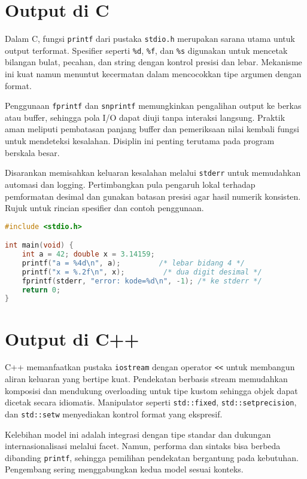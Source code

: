 \documentclass[../main.tex]{subfiles}
\begin{document}
\section{Output di C}
Dalam C, fungsi \texttt{printf} dari pustaka \texttt{stdio.h} merupakan sarana utama untuk output terformat. Spesifier seperti \texttt{\%d}, \texttt{\%f}, dan \texttt{\%s} digunakan untuk mencetak bilangan bulat, pecahan, dan string dengan kontrol presisi dan lebar. Mekanisme ini kuat namun menuntut kecermatan dalam mencocokkan tipe argumen dengan format.

Penggunaan \texttt{fprintf} dan \texttt{snprintf} memungkinkan pengalihan output ke berkas atau buffer, sehingga pola I/O dapat diuji tanpa interaksi langsung. Praktik aman meliputi pembatasan panjang buffer dan pemeriksaan nilai kembali fungsi untuk mendeteksi kesalahan. Disiplin ini penting terutama pada program berskala besar.

Disarankan memisahkan keluaran kesalahan melalui \texttt{stderr} untuk memudahkan automasi dan logging. Pertimbangkan pula pengaruh lokal terhadap pemformatan desimal dan gunakan batasan presisi agar hasil numerik konsisten. Rujuk \textcite{k&r-c-output-input,gnu-c-manual,iso-c-draft-n1570} untuk rincian spesifier dan contoh penggunaan.

\begin{lstlisting}[language=C, caption={Contoh output C dengan printf}, label={lst:c-output}]
#include <stdio.h>

int main(void) {
    int a = 42; double x = 3.14159;
    printf("a = %4d\n", a);         /* lebar bidang 4 */
    printf("x = %.2f\n", x);         /* dua digit desimal */
    fprintf(stderr, "error: kode=%d\n", -1); /* ke stderr */
    return 0;
}
\end{lstlisting}

\section{Output di C++}
C++ memanfaatkan pustaka \texttt{iostream} dengan operator \texttt{<<} untuk membangun aliran keluaran yang bertipe kuat. Pendekatan berbasis stream memudahkan komposisi dan mendukung overloading untuk tipe kustom sehingga objek dapat dicetak secara idiomatis. Manipulator seperti \texttt{std::fixed}, \texttt{std::setprecision}, dan \texttt{std::setw} menyediakan kontrol format yang ekspresif.

Kelebihan model ini adalah integrasi dengan tipe standar dan dukungan internasionalisasi melalui facet. Namun, performa dan sintaks bisa berbeda dibanding \texttt{printf}, sehingga pemilihan pendekatan bergantung pada kebutuhan. Pengembang sering menggabungkan kedua model sesuai konteks.
\end{document}

